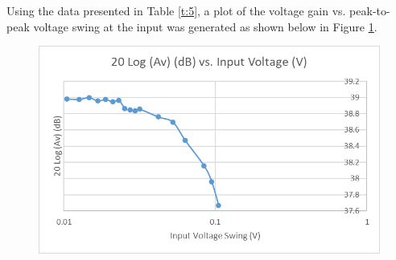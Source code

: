 \documentclass{article}
\begin{document}
	\pagebreak
	\noindent Using the data presented in Table \ref{t:5}, a plot of the voltage gain vs. peak-to-peak voltage swing at the input was generated as shown below in Figure \ref{f:3}.
	\begin{figure}[!ht]
		\centering
		\includegraphics[width=0.6\textheight]{gain_vs_inputVoltageSwing.png}
		\label{f:3}
	\end{figure}

	\pagebreak
\end{document}
